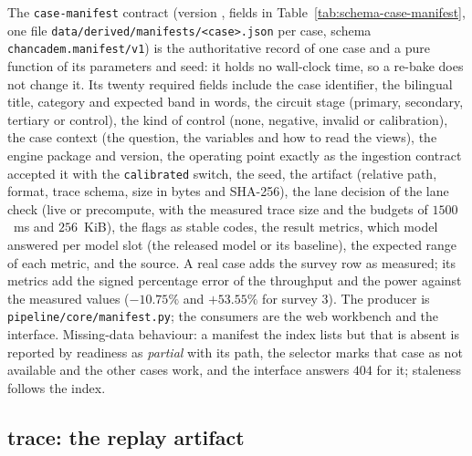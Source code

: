 The \texttt{case-manifest} contract (version , fields in Table~\ref{tab:schema-case-manifest}, one file \texttt{data/\allowbreak{}derived/\allowbreak{}manifests/\allowbreak{}<case>.json} per case, schema
\texttt{chancadem.manifest/\allowbreak{}v1}) is the authoritative record of one case and a pure function of its parameters and seed: it
holds no wall-clock time, so a re-bake does not change it. Its twenty required fields include the case identifier, the
bilingual title, category and expected band in words, the circuit stage (primary, secondary, tertiary or control), the kind of
control (none, negative, invalid or calibration), the case context (the question, the variables and how to read the views),
the engine package and version, the operating point exactly as the ingestion contract accepted it with the \texttt{calibrated}
switch, the seed, the artifact (relative path, format, trace schema, size in bytes and SHA-256), the lane decision of the lane
check (live or precompute, with the measured trace size and the budgets of $1500$~ms and $256$~KiB), the flags as stable codes,
the result metrics, which model answered per model slot (the released model or its baseline), the expected range of each
metric, and the source. A real case adds the survey row as measured; its metrics add the signed percentage error of the
throughput and the power against the measured values ($-10.75\%$ and $+53.55\%$ for survey 3). The producer is
\texttt{pipeline/\allowbreak{}core/\allowbreak{}manifest.py}; the consumers are the web workbench and the interface. Missing-data behaviour: a manifest the
index lists but that is absent is reported by readiness as \emph{partial} with its path, the selector marks that case as not
available and the other cases work, and the interface answers $404$ for it; staleness follows the index.

\subsection{trace: the replay artifact}\label{sec:data-trace}

